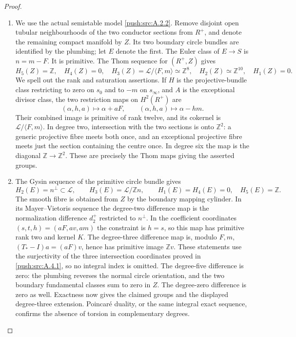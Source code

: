 \begin{proof}
\begin{enumerate}[label=\arabic*.,leftmargin=*]
\item We use the actual semistable model \ref{push:src:A.2.2}. Remove disjoint
open tubular neighbourhoods of the two conductor sections
from $R^+$, and denote the remaining compact manifold by
$Z$. Its two boundary circle bundles are identified by the
plumbing; let $E$ denote the first. The Euler class of
$E\to S$ is $n=m-F$. It is primitive. The Thom sequence
for $(R^+,Z)$ gives
\[
 H_5(Z)=\mathbb Z,\quad H_4(Z)=0,\quad
 H_3(Z)=\mathcal L/\langle F,m\rangle\simeq\mathbb Z^8,
 \quad H_2(Z)\simeq\mathbb Z^{10},\quad H_1(Z)=0.
\]
We spell out the rank and saturation assertions. If $H$ is
the projective-bundle class restricting to zero on $s_0$
and to $-m$ on $s_\infty$, and $A$ is the exceptional
divisor class, the two restriction maps on $H^2(R^+)$ are
\[
 (\alpha,h,a)\longmapsto\alpha+aF,\qquad
 (\alpha,h,a)\longmapsto\alpha-hm.
\]
Their combined image is primitive of rank twelve, and its
cokernel is $\mathcal L/\langle F,m\rangle$. In degree two,
intersection with the two sections is onto $\mathbb Z^2$:
a generic projective fibre meets both once, and an exceptional
projective fibre meets just the section containing the centre
once. In degree six the map is the diagonal
$\mathbb Z\to\mathbb Z^2$. These are precisely the Thom
maps giving the asserted groups.

\item The Gysin sequence of the primitive circle bundle gives
\[
 H_2(E)=n^\perp\subset\mathcal L,\qquad
 H_3(E)=\mathcal L/\mathbb Z n,\qquad
 H_1(E)=H_4(E)=0,\quad H_5(E)=\mathbb Z.
\]
The smooth fibre is obtained from $Z$ by the boundary
mapping cylinder. In its Mayer--Vietoris sequence the
degree-two difference map is the normalization difference
$d_2^+$ restricted to $n^\perp$. In the coefficient
coordinates $(s,t,h)=(aF,av,am)$ the constraint is $h=s$,
so this map has primitive rank two and kernel $K$.
The degree-three difference map is, modulo $F,m$,
$(T_*-I)a=(aF)v$, hence has primitive image $\mathbb Z v$.
These statements use the surjectivity of the three
intersection coordinates proved in \ref{push:src:A.4.1}, so no integral
index is omitted. The degree-five difference is zero:
the plumbing reverses the normal circle orientation, and
the two boundary fundamental classes sum to zero in $Z$.
The degree-zero difference is zero as well. Exactness now
gives the claimed groups and the displayed degree-three
extension. Poincar\'e duality, or the same integral exact
sequence, confirms the absence of torsion in complementary
degrees.


\end{enumerate}
\end{proof}
